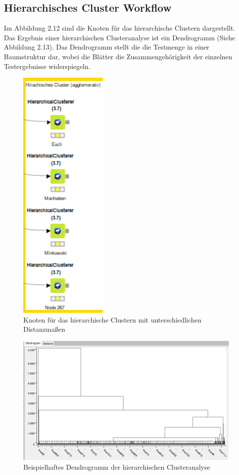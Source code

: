 \documentclass[12pt,					%
							 oneside,			%
							 a4paper,			%
							 halfparskip,		%
							 liststotoc,			%
							 bibtotoc,			%
							 fleqn,				%
							 pointlessnumbers]	%
							 {scrreprt}
\begin{document}
		\newpage
		\subsection{Hierarchisches Cluster Workflow}
		Im Abbildung 2.12 sind die Knoten für das hierarchische Clustern dargestellt.
		Das Ergebnis einer hierarchischen Clusteranalyse ist ein Dendrogramm (Siehe Abbildung 2.13). Das Dendrogramm stellt die die Testmenge in einer Baumstruktur dar, wobei die Blätter die Zusammengehörigkeit der einzelnen Testergebnisse widerspiegeln.
		\begin{figure}[!h]
			\begin{center}
				\includegraphics[scale=0.8]{pictures/hierach.png}
				\caption{Knoten für das hierarchische Clustern mit unterschiedlichen Distanzmaßen}
			\end{center}
		\end{figure}
		\begin{figure}[!h]
			\begin{center}
				\includegraphics[scale=0.4]{pictures/dendro.png}
				\caption{Beispielhaftes Dendrogramm der hierarchischen Clusteranalyse}
			\end{center}
		\end{figure}
\end{document}
